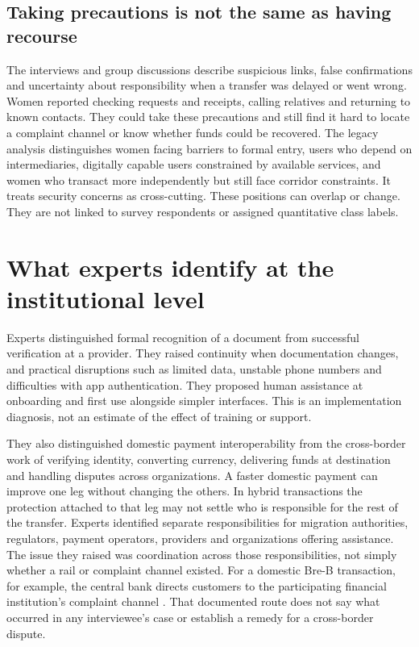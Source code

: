 \documentclass[12pt]{article}
\begin{document}
\subsection{Taking precautions is not the same as having recourse}

The interviews and group discussions describe suspicious links, false confirmations and uncertainty about responsibility when a transfer was delayed or went wrong. Women reported checking requests and receipts, calling relatives and returning to known contacts. They could take these precautions and still find it hard to locate a complaint channel or know whether funds could be recovered. The legacy analysis distinguishes women facing barriers to formal entry, users who depend on intermediaries, digitally capable users constrained by available services, and women who transact more independently but still face corridor constraints. It treats security concerns as cross-cutting. These positions can overlap or change. They are not linked to survey respondents or assigned quantitative class labels.

\section{What experts identify at the institutional level}
Experts distinguished formal recognition of a document from successful verification at a provider. They raised continuity when documentation changes, and practical disruptions such as limited data, unstable phone numbers and difficulties with app authentication. They proposed human assistance at onboarding and first use alongside simpler interfaces. This is an implementation diagnosis, not an estimate of the effect of training or support.

They also distinguished domestic payment interoperability from the cross-border work of verifying identity, converting currency, delivering funds at destination and handling disputes across organizations. A faster domestic payment can improve one leg without changing the others. In hybrid transactions the protection attached to that leg may not settle who is responsible for the rest of the transfer. Experts identified separate responsibilities for migration authorities, regulators, payment operators, providers and organizations offering assistance. The issue they raised was coordination across those responsibilities, not simply whether a rail or complaint channel existed. For a domestic Bre-B transaction, for example, the central bank directs customers to the participating financial institution's complaint channel \citep{banrepfaq}. That documented route does not say what occurred in any interviewee's case or establish a remedy for a cross-border dispute.
\end{document}
